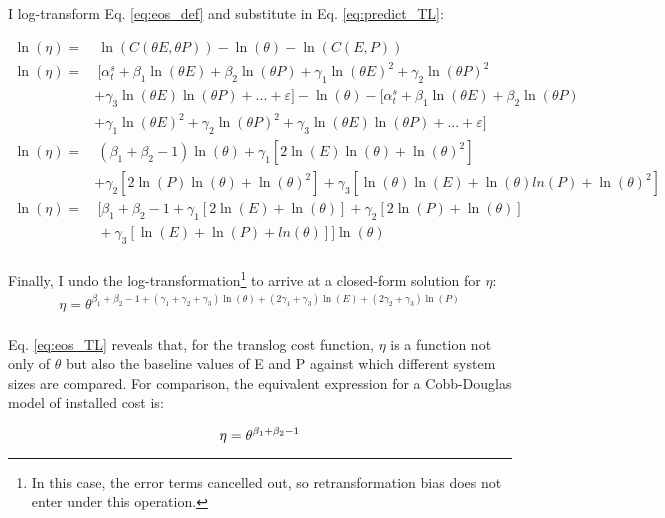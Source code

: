 I log-transform Eq. \ref{eq:eos_def} and substitute in Eq. \ref{eq:predict_TL}:

\begin{align*}
\ln(\eta) =&~\ln(C(\theta E, \theta P))-\ln(\theta) - \ln(C(E, P)) \\
\ln(\eta) =&~[\alpha^{s}_{t} + \beta_1 \ln(\theta E) + \beta_2 \ln(\theta P) + \gamma_1 \ln(\theta E)^2 + \gamma_2 \ln(\theta P)^2 \\ 
		 & + \gamma_3 \ln(\theta E) \ln(\theta P) + ... + \varepsilon] - \ln(\theta) - [\alpha^{s}_{t} + \beta_1 \ln(\theta E) + \beta_2 \ln(\theta P) \\ 
		 & + \gamma_1 \ln(\theta E)^2 + \gamma_2 \ln(\theta P)^2 + \gamma_3 \ln(\theta E) \ln(\theta P) + ... + \varepsilon] \\ 
\ln(\eta) =&~(\beta_1 + \beta_2 -1) \ln(\theta) + \gamma_1[2 \ln(E) \ln(\theta) + \ln(\theta)^2] \\ 
        & + \gamma_2[2 \ln(P) \ln(\theta) + \ln(\theta)^2] + \gamma_3 [\ln(\theta)\ln(E) + \ln(\theta)ln(P)+\ln(\theta)^2] \\ 
\ln(\eta) =&~\big[\beta_1 + \beta_2 -1 + \gamma_1[2 \ln(E) + \ln(\theta)] + \gamma_2[2 \ln(P) + \ln(\theta)]\\
        &~+ \gamma_3 [\ln(E) + \ln(P)+ln(\theta)]\big]\ln(\theta) \\ 
\end{align*}

Finally, I undo the log-transformation\footnote{In this case, the error terms cancelled out, so retransformation bias does not enter under this operation.} to arrive at a closed-form solution for $\eta$:
\begin{equation}\label{eq:eos_TL}
\begin{split}
\eta   =\theta^{\beta_1 + \beta_2 -1 + (\gamma_1 + \gamma_2 + \gamma_3) \ln(\theta) + (2\gamma_1 + \gamma_3) \ln(E) + (2\gamma_2 + \gamma_3) \ln(P)}\\ 
\end{split}
\end{equation}

Eq. \ref{eq:eos_TL} reveals that, for the translog cost function, $\eta$ is a function not only of $\theta$ but also the baseline values of E and P against which different system sizes are compared. For comparison, the equivalent expression for a Cobb-Douglas model of installed cost is:

\begin{equation}\label{eq:eos_CD}
\eta   =\theta^{\beta_1 + \beta_2 -1} \\ 
\end{equation}